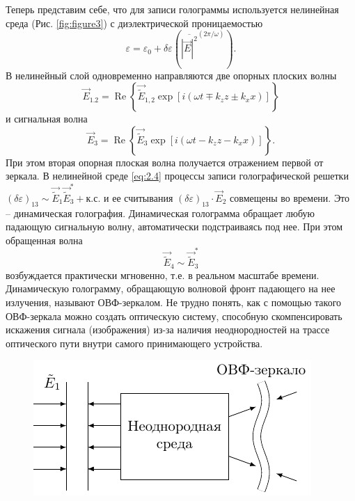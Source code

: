 Теперь представим себе, что для записи голограммы используется нелинейная среда (Рис. \ref{fig:figure3}) с диэлектрической проницаемостью
\begin{equation}
	\label{eq:2.4}
	\varepsilon=\varepsilon_{0}+\delta \varepsilon
	\left(
	\overline{{|\vec{E}|^{2}}}^{(2 \pi / \omega)}
	\right).
\end{equation}
В нелинейный слой одновременно направляются две опорных плоских волны
\begin{equation}
	\label{eq:2.5}
	\vec{E}_{1.2} =\operatorname{Re}\left\{\vec{\tilde{E}}_{1,2} \exp \left[i\left(\omega t \mp k_{z} z \pm k_{x} x\right)\right]\right\}
\end{equation}
и сигнальная волна
\begin{equation}
	\label{eq:2.6}
	\vec{E}_{3} =\operatorname{Re}\left\{\vec{\tilde{E}}_{3} \exp \left[i\left(\omega t-k_{z} z-k_{x} x\right)\right]\right\}.
\end{equation}
При этом вторая опорная плоская волна получается отражением первой от зеркала. В нелинейной среде \eqref{eq:2.4} процессы записи голографической решетки $(\delta \varepsilon)_{13} \sim \vec{\tilde{E}}_{1} \vec{\tilde{E}}_{3}^{*}+\text{к.с.}$ и ее считывания $(\delta \varepsilon )_{13} \cdot \vec{E}_2$ совмещены во времени.
Это -- динамическая голография. Динамическая голограмма обращает любую падающую сигнальную волну, автоматически подстраиваясь под нее. При этом обращенная волна
\begin{equation}
	\label{eq:2.7}
	\vec{\tilde{E}}_4 \sim \vec{\tilde{E}}_3^*
\end{equation}
возбуждается практически мгновенно, т.е. в реальном масштабе времени. Динамическую голограмму, обращающую волновой фронт падающего на нее излучения, называют ОВФ-зеркалом. Не трудно понять, как с помощью такого ОВФ-зеркала можно создать оптическую систему, способную скомпенсировать искажения сигнала (изображения) из-за наличия неоднородностей на трассе оптического пути внутри самого принимающего устройства.

\begin{figure}[ht]
	\centering
	\includegraphics[scale=1.4]{fig/fig4.pdf}
	\caption{}
	\label{fig:figure4}
\end{figure}


